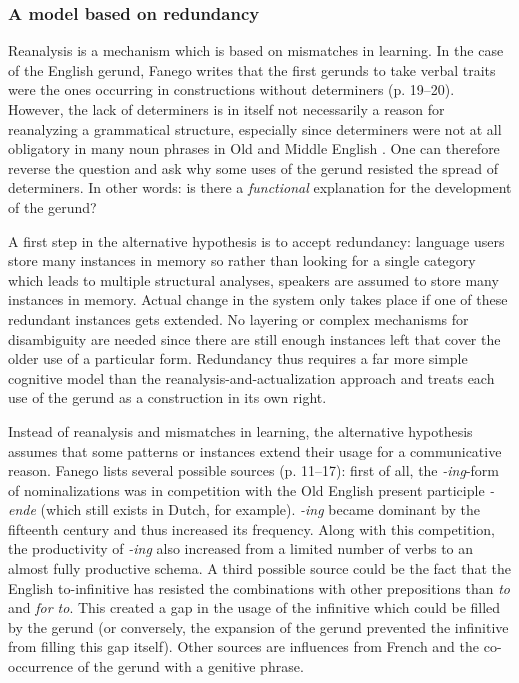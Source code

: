 \subsubsection{A model based on  redundancy} 
Reanalysis is a mechanism which is based on mismatches in learning. In the case of the English gerund, Fanego writes that the first gerunds to take verbal traits were the ones occurring in constructions without determiners (p. 19--20). However, the lack of determiners is in itself not necessarily a reason for reanalyzing a grammatical structure, especially since determiners were not at all obligatory in many noun phrases in Old and Middle English \citep[p. 172--174]{traugott92syntax}. One can therefore reverse the question and ask why some uses of the gerund resisted the spread of determiners. In other words: is there a {\em functional} explanation for the development of the gerund?

A first step in the alternative hypothesis is to accept  redundancy: language users store many instances in memory so rather than looking for a single category which leads to multiple structural analyses, speakers are assumed to store many instances in memory. Actual change in the system only takes place if one of these redundant instances gets extended. No layering or complex mechanisms for disambiguity are needed since there are still enough instances left that cover the older use of a particular form. Redundancy thus requires a far more simple cognitive model than the reanalysis-and-actualization approach and treats each use of the gerund as a construction in its own right.

Instead of reanalysis and mismatches in learning, the alternative hypothesis assumes that some patterns or instances extend their usage for a communicative reason. Fanego lists several possible sources (p. 11--17): first of all, the {\em-ing}-form of nominalizations was in competition with the Old English present participle {\em -ende} (which still exists in Dutch, for example). {\em -ing} became dominant by the fifteenth century and thus increased its frequency. Along with this competition, the productivity of {\em -ing} also increased from a limited number of verbs to an almost fully productive schema. A third possible source could be the fact that the English  to-infinitive has resisted the combinations with other prepositions than {\em to} and {\em for to}. This created a gap in the usage of the infinitive which could be filled by the gerund (or conversely, the expansion of the gerund prevented the infinitive from filling this gap itself). Other sources are influences from French and the co-occurrence of the gerund with a genitive phrase.

